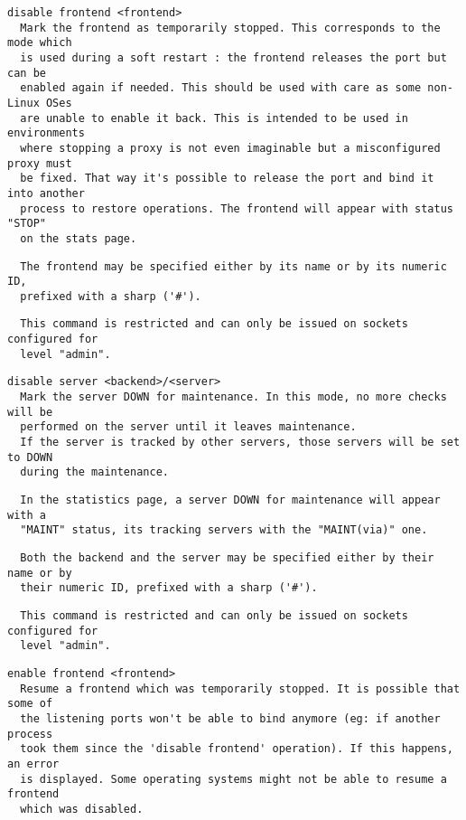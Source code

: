 \begin{verbatim}
disable frontend <frontend>
  Mark the frontend as temporarily stopped. This corresponds to the mode which
  is used during a soft restart : the frontend releases the port but can be
  enabled again if needed. This should be used with care as some non-Linux OSes
  are unable to enable it back. This is intended to be used in environments
  where stopping a proxy is not even imaginable but a misconfigured proxy must
  be fixed. That way it's possible to release the port and bind it into another
  process to restore operations. The frontend will appear with status "STOP"
  on the stats page.
\end{verbatim}

\begin{verbatim}
  The frontend may be specified either by its name or by its numeric ID,
  prefixed with a sharp ('#').
\end{verbatim}

\begin{verbatim}
  This command is restricted and can only be issued on sockets configured for
  level "admin".
\end{verbatim}

\begin{verbatim}
disable server <backend>/<server>
  Mark the server DOWN for maintenance. In this mode, no more checks will be
  performed on the server until it leaves maintenance.
  If the server is tracked by other servers, those servers will be set to DOWN
  during the maintenance.
\end{verbatim}

\begin{verbatim}
  In the statistics page, a server DOWN for maintenance will appear with a
  "MAINT" status, its tracking servers with the "MAINT(via)" one.
\end{verbatim}

\begin{verbatim}
  Both the backend and the server may be specified either by their name or by
  their numeric ID, prefixed with a sharp ('#').
\end{verbatim}

\begin{verbatim}
  This command is restricted and can only be issued on sockets configured for
  level "admin".
\end{verbatim}

\begin{verbatim}
enable frontend <frontend>
  Resume a frontend which was temporarily stopped. It is possible that some of
  the listening ports won't be able to bind anymore (eg: if another process
  took them since the 'disable frontend' operation). If this happens, an error
  is displayed. Some operating systems might not be able to resume a frontend
  which was disabled.
\end{verbatim}

